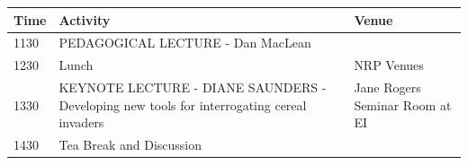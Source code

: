 \documentclass[12pt,]{book}
\theoremstyle{definition}
\theoremstyle{definition}
\theoremstyle{remark}
\begin{document}
\begin{longtable}[]{@{}lll@{}}
\toprule
\begin{minipage}[b]{0.09\columnwidth}\raggedright\strut
Time\strut
\end{minipage} & \begin{minipage}[b]{0.39\columnwidth}\raggedright\strut
Activity\strut
\end{minipage} & \begin{minipage}[b]{0.39\columnwidth}\raggedright\strut
Venue\strut
\end{minipage}\tabularnewline
\midrule
\endhead
\begin{minipage}[t]{0.09\columnwidth}\raggedright\strut
1130\strut
\end{minipage} & \begin{minipage}[t]{0.39\columnwidth}\raggedright\strut
PEDAGOGICAL LECTURE - Dan MacLean\strut
\end{minipage} & \begin{minipage}[t]{0.39\columnwidth}\raggedright\strut
\strut
\end{minipage}\tabularnewline
\begin{minipage}[t]{0.09\columnwidth}\raggedright\strut
1230\strut
\end{minipage} & \begin{minipage}[t]{0.39\columnwidth}\raggedright\strut
Lunch\strut
\end{minipage} & \begin{minipage}[t]{0.39\columnwidth}\raggedright\strut
NRP Venues\strut
\end{minipage}\tabularnewline
\begin{minipage}[t]{0.09\columnwidth}\raggedright\strut
1330\strut
\end{minipage} & \begin{minipage}[t]{0.39\columnwidth}\raggedright\strut
KEYNOTE LECTURE - DIANE SAUNDERS - Developing new tools for
interrogating cereal invaders\strut
\end{minipage} & \begin{minipage}[t]{0.39\columnwidth}\raggedright\strut
Jane Rogers Seminar Room at EI\strut
\end{minipage}\tabularnewline
\begin{minipage}[t]{0.09\columnwidth}\raggedright\strut
1430\strut
\end{minipage} & \begin{minipage}[t]{0.39\columnwidth}\raggedright\strut
Tea Break and Discussion\strut
\end{minipage} & \begin{minipage}[t]{0.39\columnwidth}\raggedright\strut

\end{minipage}
\end{longtable}
\end{document}
